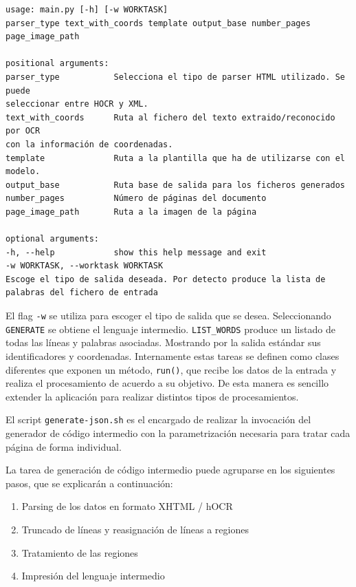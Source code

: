 \begin{lstlisting}[caption={Ayuda del generador de código intermedio.},label=lst:ayuda-generador-codigo-intermedio]
usage: main.py [-h] [-w WORKTASK]
parser_type text_with_coords template output_base number_pages page_image_path

positional arguments:
parser_type           Selecciona el tipo de parser HTML utilizado. Se puede
seleccionar entre HOCR y XML.
text_with_coords      Ruta al fichero del texto extraido/reconocido por OCR
con la información de coordenadas.
template              Ruta a la plantilla que ha de utilizarse con el
modelo.
output_base           Ruta base de salida para los ficheros generados
number_pages          Número de páginas del documento
page_image_path       Ruta a la imagen de la página

optional arguments:
-h, --help            show this help message and exit
-w WORKTASK, --worktask WORKTASK
Escoge el tipo de salida deseada. Por detecto produce la lista de palabras del fichero de entrada
\end{lstlisting}

El flag \verb|-w| se utiliza para escoger el tipo de salida que se desea. Seleccionando \verb|GENERATE| se obtiene el lenguaje intermedio. \verb|LIST_WORDS| produce un listado de todas las líneas y palabras asociadas. Mostrando por la salida estándar sus identificadores y coordenadas. Internamente estas tareas se definen como clases diferentes que exponen un método, \verb|run()|, que recibe los datos de la entrada y realiza el procesamiento de acuerdo a su objetivo. De esta manera es sencillo extender la aplicación para realizar distintos tipos de procesamientos.

El script \verb|generate-json.sh| es el encargado de realizar la invocación del generador de código intermedio con la parametrización necesaria para tratar cada página de forma individual.

La tarea de generación de código intermedio puede agruparse en los siguientes pasos, que se explicarán a continuación:

\begin{enumerate}
    \item Parsing de los datos en formato XHTML / hOCR
    \item Truncado de líneas y reasignación de líneas a regiones
    \item Tratamiento de las regiones
    \item Impresión del lenguaje intermedio
\end{enumerate}    

